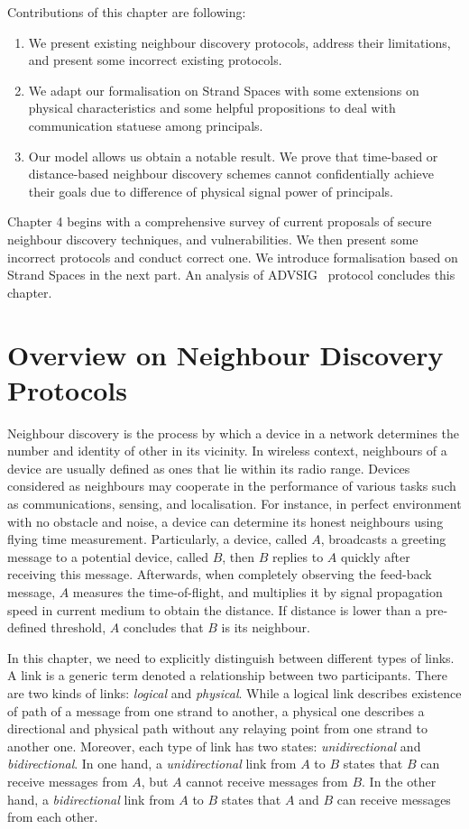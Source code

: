 Contributions of this chapter are following:
\begin{enumerate}
\item We present existing neighbour discovery protocols, address their limitations, and present some incorrect existing protocols.  
\item We adapt our formalisation on Strand Spaces with some extensions on physical characteristics and some helpful propositions to deal with communication statuese among principals. 
\item Our model allows us obtain a notable result. We prove that time-based or distance-based neighbour discovery schemes cannot confidentially achieve their goals due to difference of physical signal power of principals. 
\end{enumerate}

Chapter 4 begins with a comprehensive survey of current proposals of secure neighbour discovery techniques, and vulnerabilities. We then present some incorrect protocols and conduct correct one. We introduce formalisation based on Strand Spaces in the next part. An analysis of ADVSIG~\cite{Raffo:2004:ASS:1029102.1029106} protocol concludes this chapter. 
 
 \section{Overview on Neighbour Discovery Protocols}

Neighbour discovery is the process by which a device in a network determines the number and identity of other in its vicinity. In wireless context, neighbours of a device are usually defined as ones that lie within its radio range. Devices considered as neighbours may cooperate in the performance of various tasks such as communications, sensing, and localisation. For instance, in perfect environment with no obstacle and noise, a device can determine its honest neighbours using flying time measurement. Particularly, a device, called $A$, broadcasts a greeting message to a potential device, called $B$, then $B$ replies to $A$ quickly after receiving this message. Afterwards, when completely observing the feed-back message, $A$ measures the time-of-flight, and multiplies it by signal propagation speed in current medium to obtain the distance. If distance is lower than a pre-defined threshold, $A$ concludes that $B$ is its neighbour. 

In this chapter, we need to explicitly distinguish between different types of links. A link is a generic term denoted a relationship between two participants. There are two kinds of links: \emph{logical} and \emph{physical}. While a logical link describes existence of path of a message from one strand to another, a physical one describes a directional and physical path without any relaying point from one strand to another one. Moreover, each type of link has two states: \emph{unidirectional} and \emph{bidirectional}. In one hand, a \emph{unidirectional} link from $A$ to $B$ states that $B$ can receive messages from $A$, but $A$ cannot receive messages from $B$. In the other hand, a \emph{bidirectional} link from $A$ to $B$ states 
that $A$ and $B$ can receive messages from each other. 


